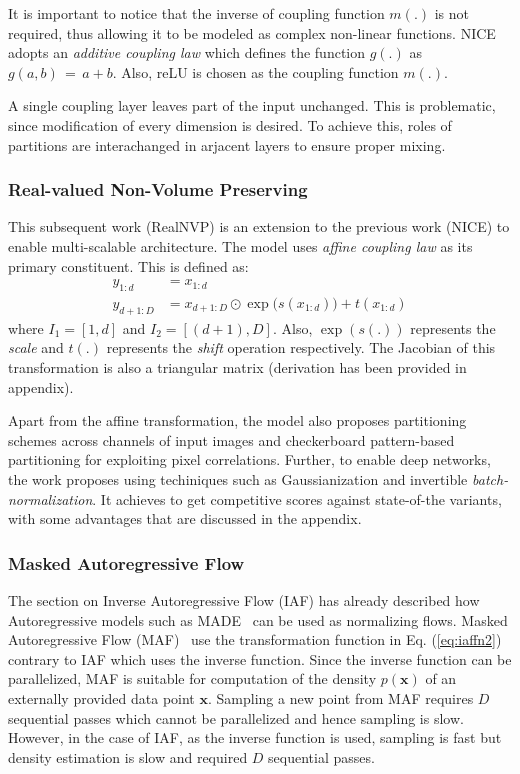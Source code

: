 \documentclass[runningheads]{llncs}
\begin{document}
It is important to notice that the inverse of coupling function $m(.)$ is not required, thus allowing it to be modeled as complex non-linear functions. NICE adopts an \textit{additive coupling law} which defines the function $g(.)$ as $g(a,b)\,=\,a+b$. Also, reLU is chosen as the coupling function $m(.)$.

A single coupling layer leaves part of the input unchanged. This is problematic, since modification of every dimension is desired. To achieve this, roles of partitions are interachanged in arjacent layers to ensure proper mixing. 
 
\subsubsection{Real-valued Non-Volume Preserving} \label{sec:realnvp}
This subsequent work (RealNVP) \cite{dinh2016density} is an extension to the previous work (NICE) to enable multi-scalable architecture. The model uses \textit{affine coupling law} as its primary constituent. This is defined as:
\begin{align}
y_{1:d} &= x_{1:d}\\
y_{d+1:D} &= x_{d+1:D} \odot \exp\big(s(x_{1:d})\big) + t(x_{1:d})
\end{align}
where $I_1 = [1,d]$ and $I_2 = [(d+1),D]$. Also, $\exp(s(.))$ represents the \textit{scale} and $t(.)$ represents the \textit{shift} operation respectively. The Jacobian of this transformation is also a triangular matrix (derivation has been provided in appendix).

Apart from the affine transformation, the model also proposes partitioning schemes across channels of input images and checkerboard pattern-based partitioning for exploiting pixel correlations. Further, to enable deep networks, the work proposes using techiniques such as Gaussianization and invertible \textit{batch-normalization}. It achieves to get competitive scores against state-of-the variants, with some advantages that are discussed in the appendix.

\subsubsection{Masked Autoregressive Flow} The section on Inverse Autoregressive Flow (IAF) has already described how Autoregressive models such as MADE~\cite{germain2015made} can be used as normalizing flows. Masked Autoregressive Flow (MAF)~\cite{papamakarios2017masked} use the transformation function in Eq. (\ref{eq:iaffn2}) contrary to IAF which uses the inverse function. Since the inverse function can be parallelized, MAF is suitable for computation of the density $p(\mathbf{x})$ of an externally provided data point $\mathbf{x}$. Sampling a new point from MAF requires $D$ sequential passes which cannot be parallelized and hence sampling is slow. However, in the case of IAF, as the inverse function is used, sampling is fast but density estimation is slow and required $D$ sequential passes.
\end{document}
